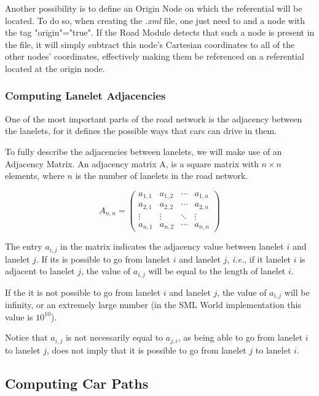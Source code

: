 Another possibility is to define an Origin Node on which the referential will be located. To do so, when creating the \textit{.xml} file, one just need to and a node with the tag "origin"="true". If the Road Module detects that such a node is present in the file, it will simply subtract this node's Cartesian coordinates to all of the other nodes' coordinates, effectively making them be referenced on a referential located at the origin node.

\subsubsection{Computing Lanelet Adjacencies}

One of the most important parts of the road network is the adjacency between the lanelets, for it defines the possible ways that cars can drive in them.

To fully describe the adjacencies between lanelets, we will make use of an Adjacency Matrix. An adjacency matrix A, is a square matrix with $n \times n$ elements, where $n$ is the number of lanelets in the road network.

\[
A_{n,n} = 
 \begin{pmatrix}
  a_{1,1} & a_{1,2} & \cdots & a_{1,n} \\
  a_{2,1} & a_{2,2} & \cdots & a_{2,n} \\
  \vdots  & \vdots  & \ddots & \vdots  \\
  a_{n,1} & a_{n,2} & \cdots & a_{n,n} 
 \end{pmatrix}
\]
 
The entry $a_{i,j}$ in the matrix indicates the adjacency value between lanelet $i$ and lanelet $j$. If its is possible to go from lanelet $i$ and lanelet $j$, \textit{i.e.}, if it lanelet $i$ is adjacent to lanelet $j$, the value of $a_{i,j}$ will be equal to the length of lanelet $i$.

If the it is not possible to go from lanelet $i$ and lanelet $j$, the value of $a_{i,j}$ will be infinity, or an extremely large number (in the SML World implementation this value is $10^{10}$).

Notice that $a_{i,j}$ is not necessarily equal to $a_{j,i}$, as being able to go from lanelet $i$ to lanelet $j$, does not imply that it is possible to go from lanelet $j$ to lanelet $i$.

\subsection{Computing Car Paths}

